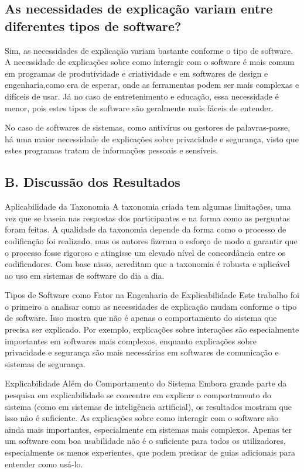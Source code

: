 \documentclass[conference]{IEEEtran}
\begin{document}
\subsection* {As necessidades de explicação variam entre diferentes tipos de software?}
Sim,  as necessidades de explicação variam bastante conforme o tipo de software. A necessidade de explicações sobre como interagir com o software é mais comum em programas de produtividade e criatividade e em softwares de design e engenharia,como era de esperar, onde as ferramentas podem ser mais complexas e difíceis de usar. Já no caso de entretenimento e educação, essa necessidade é menor, pois estes tipos de software são geralmente mais fáceis de entender.

No caso de softwares de sistemas, como antivírus ou gestores de palavras-passe, há uma maior necessidade de explicações sobre privacidade e segurança, visto que estes programas tratam de informações pessoais e sensíveis.

\subsection{B. Discussão dos Resultados}
Aplicabilidade da Taxonomia
A taxonomia criada tem algumas limitações, uma vez que se baseia nas respostas dos participantes e na forma como as perguntas foram feitas. A qualidade da taxonomia depende da forma como o processo de codificação foi realizado, mas os autores fizeram o esforço de modo a garantir que o processo fosse rigoroso e atingisse um elevado nível de concordância entre os codificadores. Com base nisso, acreditam que a taxonomia é robusta e aplicável ao uso em sistemas de software do dia a dia.

Tipos de Software como Fator na Engenharia de Explicabilidade
Este trabalho foi o primeiro a analisar como as necessidades de explicação mudam conforme o tipo de software. Isso mostra que não é apenas o comportamento do sistema que precisa ser explicado. Por exemplo, explicações sobre interações são especialmente importantes em softwares mais complexos, enquanto explicações sobre privacidade e segurança são mais necessárias em softwares de comunicação e sistemas de segurança.

Explicabilidade Além do Comportamento do Sistema
Embora grande parte da pesquisa em explicabilidade se concentre em explicar o comportamento do sistema (como em sistemas de inteligência artificial), os resultados mostram que isso não é suficiente. As explicações sobre como interagir com o software são ainda mais importantes, especialmente em sistemas mais complexos. Apenas ter um software com boa usabilidade não é o suficiente para todos os utilizadores, especialmente os menos experientes, que podem precisar de guias adicionais para entender como usá-lo.
\end{document}
